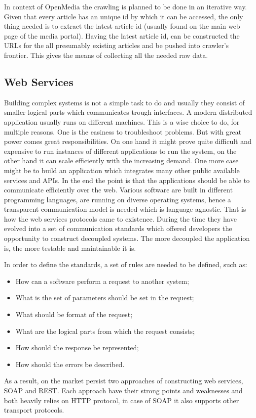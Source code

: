 In context of OpenMedia the crawling is planned to be done in an iterative way. Given that every article has an unique id by which it can be accessed, the only thing needed is to extract the latest article id (usually found on the main web page of the media portal). Having the latest article id, can be constructed the URLs for the all presumably existing articles and be pushed into crawler's frontier. This gives the means of collecting all the needed raw data.

\subsection{Web Services}
Building complex systems is not a simple task to do and usually they consist of smaller logical parts which communicates trough interfaces. A modern distributed application usually runs on different machines. This is a wise choice to do, for multiple reasons. One is the easiness to troubleshoot problems. But with great power comes great responsibilities. On one hand it might prove quite difficult and expensive to run instances of different applications to run the system, on the other hand it can scale efficiently with the increasing demand. One more case might be to build an application which integrates many other public available services and APIs. In the end the point is that the applications should be able to communicate efficiently over the web. Various software are built in different programming languages, are running on diverse operating systems, hence a transparent communication model is needed which is language agnostic. That is how the web services protocols came to existence. During the time they have evolved into a set of communication standards which offered developers the opportunity to construct decoupled systems. The more decoupled the application is, the more testable and maintainable it is.

In order to define the standards, a set of rules are needed to be defined, such as:
\begin{itemize}
    \item How can a software perform a request to another system;
    \item What is the set of parameters should be set in the request;
    \item What should be format of the request;
    \item What are the logical parts from which the request consists;
    \item How should the response be represented;
    \item How should the errors be described.
\end{itemize}
\clearpage
As a result, on the market persist two approaches of constructing web services, SOAP and REST. Each approach have their strong points and weaknesses and both heavily relies on HTTP protocol, in case of SOAP it also supports other transport protocols.

